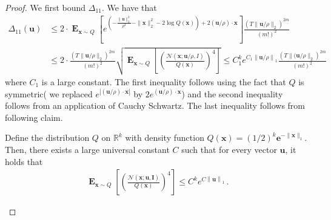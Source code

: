 \documentclass{theoretics}
\newcommand\twonorm[1]{\|#1\|_2}
\newcommand\norm[1]{\left\| #1 \right\|}
\renewcommand\vec[1]{\mathbf{#1}}
\DeclareMathOperator*{\E}{\mathbf{E}}
\newcommand{\e}{\mathbf{e}}
\newcommand{\R}{\mathbb{R}}
\newcommand{\1}{\Ind}
\newcommand{\x}{\vec x}
\newcommand{\vu}{\vec u}
\newcommand{\Gauss}{\mathcal{N}}
\begin{document}
\begin{proof}
      We first bound $\Delta_{11}$. We have that 
      \begin{align*}
        \Delta_{11}(\vu)&\leq 
            2\cdot \E_{\x\sim Q}\left[e^{\left(-\frac{\twonorm{\vu}^2}{\rho^2}-\twonorm{\x}^2-2\log Q{(\x)}\right)+{2(\vu/\rho)\cdot \x}}\right]\frac{\left(T\twonorm{\vu/\rho}\right)^{2m}}{(m!)^2}  \\
            &\leq 2\cdot\frac{\left(T\twonorm{\vu/\rho}\right)^{2m}}{(m!)^2} \sqrt{\E_{\x\sim Q}\left[\left(\frac{\Gauss(\x;\vu/\rho,I)}{Q(\x)}\right)^4\right]} 
            \leq C_1^ke^{C_1\norm{\vu/\rho}_1}\frac{\left(T\twonorm{(\vu/\rho}\right)^{2m}}{(m!)^2} 
      \end{align*}
      where $C_1$ is a large constant.
      The first inequality follows using the fact that $Q$ is symmetric( we replaced $e^{|(\vu/\rho)\cdot \x|}$ by $2e^{(\vu/\rho)\cdot \x}$) and the second inequality follows from an application of Cauchy Schwartz. The last inequality follows from following claim.
      \begin{lemma}
    \label{lem:ratio_subexp}
Define the distribution $Q$ on $\R^k$ with density function $Q(\x) = (1/2)^k 
\e^{-\|\x\|_1}$.  Then, there exists a large universal constant $C$ such that for every vector $\vu$, it holds that
\begin{align*}
    \E_{\x\sim Q}\left[\left(\frac{\mathcal{N}(\x; \vu, \vec I)}{
    Q(\x)}\right)^4\right] \leq 
    C^ke^{C\norm{\vu}_1}\,.
    \end{align*} 
\end{lemma}


\end{proof}
\end{document}
